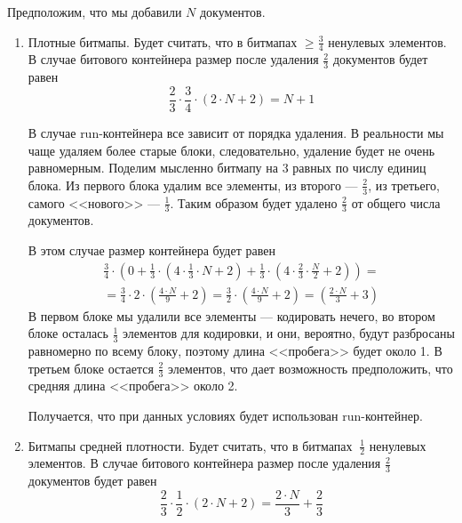 Предположим, что мы добавили $N$ документов.
\begin{enumerate}
    \item Плотные битмапы. Будет считать, что в битмапах $\geq \frac{3}{4}$
    ненулевых элементов. В случае битового контейнера размер после удаления
    $\frac{2}{3}$ документов будет равен
    \begin{equation}
        \frac{2}{3} \cdot \frac{3}{4} \cdot \left(2\cdot N + 2\right) = N + 1
    \end{equation}
    
    В случае run-контейнера все зависит от порядка удаления. В реальности
    мы чаще удаляем более старые блоки, следовательно, удаление будет не очень
    равномерным. Поделим мысленно битмапу на 3 равных по числу единиц блока.
    Из первого блока удалим все элементы, из второго — $\frac{2}{3}$, из
    третьего, самого <<нового>> — $\frac{1}{3}$. Таким образом будет удалено
    $\frac{2}{3}$ от общего числа документов.

    В этом случае размер контейнера будет равен
    \begin{multline}
        \frac{3}{4} \cdot \left(0 +
            \frac{1}{3} \cdot \left(4 \cdot \frac{1}{3} \cdot N + 2\right) +
            \frac{1}{3} \cdot \left(4 \cdot \frac{2}{3} \cdot \frac{N}{2} + 2\right)
            \right) =\\
            = \frac{3}{4} \cdot 2 \cdot \left(\frac{4 \cdot N}{9} + 2\right)
            = \frac{3}{2} \cdot \left(\frac{4 \cdot N}{9} + 2\right)
            = \left(\frac{2 \cdot N}{3} + 3\right)
    \end{multline}
    В первом блоке мы удалили все элементы — кодировать нечего, во втором блоке
    осталась $\frac{1}{3}$ элементов для кодировки, и они, вероятно, будут
    разбросаны равномерно по всему блоку, поэтому длина <<пробега>> будет около 1.
    В третьем блоке остается $\frac{2}{3}$ элементов, что дает возможность
    предположить, что средняя длина <<пробега>> около 2.

    Получается, что при данных условиях будет использован run-контейнер.

    \item Битмапы средней плотности. Будет считать, что в битмапах $~ \frac{1}{2}$
    ненулевых элементов. В случае битового контейнера размер после удаления
    $\frac{2}{3}$ документов будет равен
    \begin{equation}
        \frac{2}{3} \cdot \frac{1}{2} \cdot \left(2\cdot N + 2\right) = \frac{2\cdot N}{3} + \frac{2}{3}
    \end{equation}


\end{enumerate}
